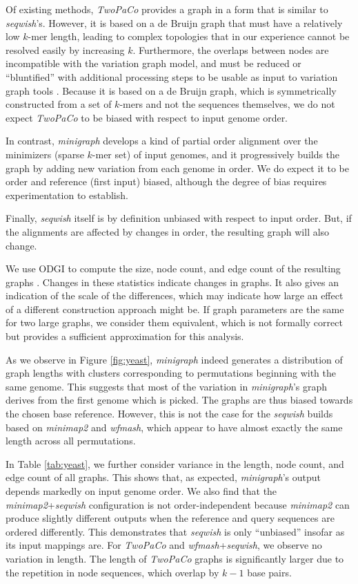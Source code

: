 \documentclass{bioinfo}
\theoremstyle{definition}
\begin{document}
Of existing methods, \textit{TwoPaCo} provides a graph in a form that is similar to \textit{seqwish}'s.
However, it is based on a de Bruijn graph that must have a relatively low $k$-mer length, leading to complex topologies that in our experience cannot be resolved easily by increasing $k$.
Furthermore, the overlaps between nodes are incompatible with the variation graph model, and must be reduced or ``bluntified'' with additional processing steps to be usable as input to variation graph tools \citep{Eizenga2021-yg}.
Because it is based on a de Bruijn graph, which is symmetrically constructed from a set of $k$-mers and not the sequences themselves, we do not expect \textit{TwoPaCo} to be biased with respect to input genome order.

In contrast, \textit{minigraph} develops a kind of partial order alignment \citep{Lee_2002} over the minimizers (sparse $k$-mer set) of input genomes, and it progressively builds the graph by adding new variation from each genome in order.
We do expect it to be order and reference (first input) biased, although the degree of bias requires experimentation to establish.

Finally, \textit{seqwish} itself is by definition unbiased with respect to input order.
But, if the alignments are affected by changes in order, the resulting graph will also change.

We use ODGI to compute the size, node count, and edge count of the resulting graphs \citep{Guarracino2022}.
Changes in these statistics indicate changes in graphs.
It also gives an indication of the scale of the differences, which may indicate how large an effect of a different construction approach might be.
If graph parameters are the same for two large graphs, we consider them equivalent, which is not formally correct but provides a sufficient approximation for this analysis.

As we observe in Figure \ref{fig:yeast}, \textit{minigraph} indeed generates a distribution of graph lengths with clusters corresponding to permutations beginning with the same genome.
This suggests that most of the variation in \textit{minigraph}'s graph derives from the first genome which is picked.
The graphs are thus biased towards the chosen base reference.
However, this is not the case for the \textit{seqwish} builds based on \textit{minimap2} and \textit{wfmash}, which appear to have almost exactly the same length across all permutations.

In Table \ref{tab:yeast}, we further consider variance in the length, node count, and edge count of all graphs.
This shows that, as expected, \textit{minigraph}'s output depends markedly on input genome order.
We also find that the \textit{minimap2}+\textit{seqwish} configuration is not order-independent because \textit{minimap2} can produce slightly different outputs when the reference and query sequences are ordered differently.
This demonstrates that \textit{seqwish} is only ``unbiased'' insofar as its input mappings are.
For \textit{TwoPaCo} and \textit{wfmash}+\textit{seqwish}, we observe no variation in length.
The length of \textit{TwoPaCo} graphs is significantly larger due to the repetition in node sequences, which overlap by $k-1$ base pairs.
\end{document}
